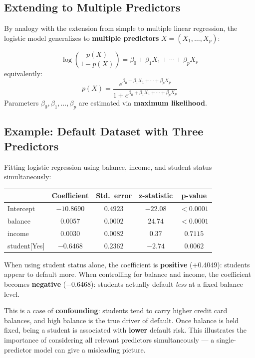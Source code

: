 \documentclass[11pt,a4paper]{article}
\theoremstyle{definition}
\theoremstyle{plain}
\theoremstyle{remark}
\begin{document}
\subsection{Extending to Multiple Predictors}

By analogy with the extension from simple to multiple linear regression, the logistic model generalizes to \textbf{multiple predictors} $X = (X_1, \ldots, X_p)$:

\begin{tcolorbox}[colback=blue!5!white,colframe=blue!75!black,title=\textbf{Multiple Logistic Regression}]
\[
    \log\!\left(\frac{p(X)}{1 - p(X)}\right) = \beta_0 + \beta_1 X_1 + \cdots + \beta_p X_p
\]
equivalently:
\[
    p(X) = \frac{e^{\beta_0 + \beta_1 X_1 + \cdots + \beta_p X_p}}{1 + e^{\beta_0 + \beta_1 X_1 + \cdots + \beta_p X_p}}
\]
Parameters $\beta_0, \beta_1, \ldots, \beta_p$ are estimated via \textbf{maximum likelihood}.
\end{tcolorbox}

\subsection{Example: Default Dataset with Three Predictors}

Fitting logistic regression using balance, income, and student status simultaneously:

\begin{center}
\begin{tabular}{lcccc}
\hline
 & Coefficient & Std.\ error & z-statistic & p-value \\
\hline
Intercept      & $-10.8690$ & $0.4923$ & $-22.08$ & $<0.0001$ \\
balance        & $0.0057$   & $0.0002$ & $24.74$  & $<0.0001$ \\
income         & $0.0030$   & $0.0082$ & $0.37$   & $0.7115$  \\
student[Yes]   & $-0.6468$  & $0.2362$ & $-2.74$  & $0.0062$  \\
\hline
\end{tabular}
\end{center}

\begin{tcolorbox}[colback=orange!5!white,colframe=orange!75!black,title=\textbf{Confounding: the Student Sign Reversal}]
When using student status alone, the coefficient is \textbf{positive} (+0.4049): students appear to default more. When controlling for balance and income, the coefficient becomes \textbf{negative} ($-0.6468$): students actually default \textit{less} at a fixed balance level.

This is a case of \textbf{confounding}: students tend to carry higher credit card balances, and high balance is the true driver of default. Once balance is held fixed, being a student is associated with \textbf{lower} default risk. This illustrates the importance of considering all relevant predictors simultaneously — a single-predictor model can give a misleading picture.
\end{tcolorbox}
\end{document}
